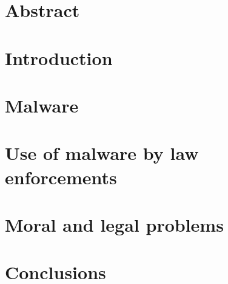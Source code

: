 

	
	\tableofcontents
    \clearpage
	\section*{Abstract}
    \label{sect:Abstract}
		
	\section*{Introduction}
    \label{sect:Introduction}
    
	\section*{Malware}
    \label{sect:Malware}
    
	\section*{Use of malware by law enforcements}
    \label{sect:Use of malware by law enforcements}
    
	\section*{Moral and legal problems}
    \label{sect:Moral and legal problems}
    
    \section*{Conclusions}
    \label{sect:Conclusions}
	
    \label{sect:References}
    \printbibliography[title={References}]
